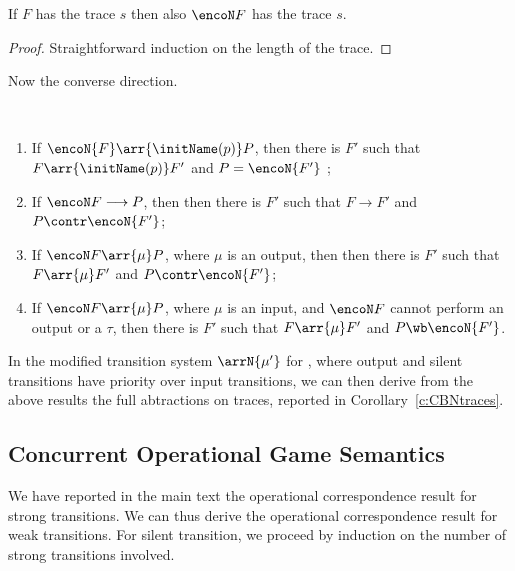 

\begin{theorem}
\label{t:tracesGSpi_cbn}
If $F$  has the trace $s$ then also $ \encoN F$ has the trace $s$.
\end{theorem} 

\begin{proof}
Straightforward induction on the length of the trace. 
\end{proof} 
\noindent
Now the converse direction. 


\begin{lemma}
\label{l:opcorr_cbnshort_piI}
$ $ \begin{enumerate}

\item   
If $\encoN{F } \arr  {\initName (p)}  
P$, 
then there is $F'$ such that 
 $F \arr{\initName (p)} F'$
 and
 $P = 
 \encoN{F'}$ ; 

\item  If 
$ \encoN F \longrightarrow P$, then 
then there is $F'$ such that 
$F \longrightarrow F'$ and  
$ P  \contr \encoN {F'}$; 

\item  If
$ \encoN F \arr{\mu} P$, 
where $\mu$ is an output,
 then 
then there is $F'$ such that 
$  F \arr{\mu} F' $ and 
$P  \contr  \encoN  {F'}$; 

\item  If
$ \encoN F \arr{\mu} P$, 
where $\mu$ is an input,  and 
$ \encoN F$ cannot  perform an output or a $\tau$,  
then there is $F'$ such that 
$  F \arr{\mu} F' $ and 
$P  \wb  \encoN  {F'}$. 
\end{enumerate}
\end{lemma} 
\noindent
In the modified transition system $\arrN {\mu'}$  for \piI, where output and silent transitions have
priority over input transitions, we can then derive from the above results the  full
abtractions on traces, reported in Corollary~\ref{c:CBNtraces}. 

\subsection{Concurrent Operational Game Semantics}


We have reported in the main text the operational correspondence result for strong
transitions. We can thus derive the 
operational correspondence result for weak
transitions.
 For silent transition, we proceed by
induction on the number of strong transitions involved. 

